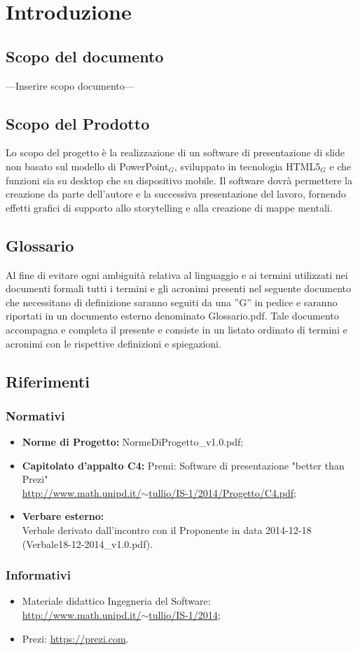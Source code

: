 \section{Introduzione}

\subsection{Scopo del documento}
---Inserire scopo documento---

\subsection{Scopo del Prodotto}
Lo scopo del progetto è la realizzazione di un software di presentazione di slide non basato sul modello di PowerPoint$_{G}$, sviluppato in tecnologia HTML5$_{G}$ e che funzioni sia su desktop che su dispositivo mobile. Il software dovrà permettere la creazione da parte dell'autore e la successiva presentazione del lavoro, fornendo effetti grafici di supporto allo storytelling e alla creazione di mappe mentali. 


\subsection{Glossario}
Al fine di evitare ogni ambiguità relativa al linguaggio e ai termini utilizzati nei documenti formali tutti i termini e gli acronimi presenti nel seguente documento che necessitano di definizione saranno seguiti da una ”G” in pedice e saranno riportati in un documento esterno denominato Glossario.pdf. Tale documento accompagna e completa il presente e consiste in un listato ordinato di termini e acronimi con le rispettive definizioni e spiegazioni.

\subsection{Riferimenti}
\subsubsection{Normativi}
\begin{itemize}
	\item \textbf{Norme di Progetto:} NormeDiProgetto\_v1.0.pdf;
	\item \textbf{Capitolato d’appalto C4:} Premi: Software di presentazione "better than Prezi"\\ \href{http://www.math.unipd.it/~tullio/IS-1/2014/Progetto/C4.pdf}{http://www.math.unipd.it/$\sim$tullio/IS-1/2014/Progetto/C4.pdf};
	\item \textbf{Verbare esterno:} \\ 
		Verbale derivato dall'incontro con il Proponente in data 2014-12-18 (Verbale18-12-2014\_v1.0.pdf).
\end{itemize}

\subsubsection{Informativi}
\begin{itemize}
	\item Materiale didattico Ingegneria del Software: \\
	\href{http://www.math.unipd.it/~tullio/IS-1/2014}{http://www.math.unipd.it/$\sim$tullio/IS-1/2014};
	
	\item Prezi:
	\href{https://prezi.com}{https://prezi.com}.
\end{itemize}